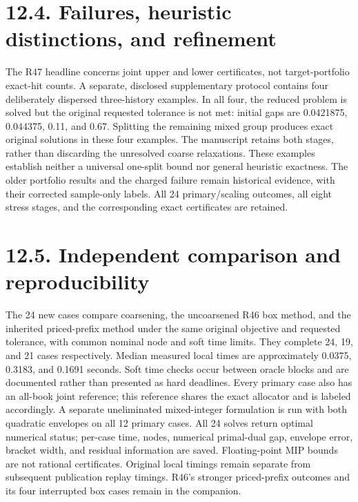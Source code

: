 \documentclass[11pt]{article}
\begin{document}
\section*{12.4. Failures, heuristic distinctions, and refinement}
The R47 headline concerns joint upper and lower certificates, not target-portfolio exact-hit counts. A separate, disclosed supplementary protocol contains four deliberately dispersed three-history examples. In all four, the reduced problem is solved but the original requested tolerance is not met: initial gaps are 0.0421875, 0.044375, 0.11, and 0.67. Splitting the remaining mixed group produces exact original solutions in these four examples. The manuscript retains both stages, rather than discarding the unresolved coarse relaxations. These examples establish neither a universal one-split bound nor general heuristic exactness. The older portfolio results and the charged failure remain historical evidence, with their corrected sample-only labels. All 24 primary/scaling outcomes, all eight stress stages, and the corresponding exact certificates are retained.

\section*{12.5. Independent comparison and reproducibility}
The 24 new cases compare coarsening, the uncoarsened R46 box method, and the inherited priced-prefix method under the same original objective and requested tolerance, with common nominal node and soft time limits. They complete 24, 19, and 21 cases respectively. Median measured local times are approximately 0.0375, 0.3183, and 0.1691 seconds. Soft time checks occur between oracle blocks and are documented rather than presented as hard deadlines. Every primary case also has an all-book joint reference; this reference shares the exact allocator and is labeled accordingly. A separate uneliminated mixed-integer formulation is run with both quadratic envelopes on all 12 primary cases. All 24 solves return optimal numerical status; per-case time, nodes, numerical primal-dual gap, envelope error, bracket width, and residual information are saved. Floating-point MIP bounds are not rational certificates. Original local timings remain separate from subsequent publication replay timings. R46's stronger priced-prefix outcomes and its four interrupted box cases remain in the companion.
\end{document}
